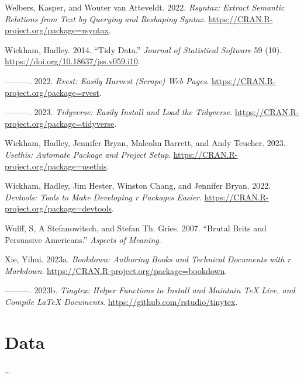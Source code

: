 \documentclass[
  letterpaper,
]{latex/krantz}
\newlength{\cslhangindent}
\newlength{\cslentryspacingunit} %
\newenvironment{CSLReferences}[2] %
 {%
  \setlength{\parindent}{0pt}
  \ifodd #1
  \let\oldpar\par
  \def\par{\hangindent=\cslhangindent\oldpar}
  \fi
  \setlength{\parskip}{#2\cslentryspacingunit}
 }%
 {}
\begin{document}
\begin{CSLReferences}{1}{0}
\leavevmode{}%
Welbers, Kasper, and Wouter van Atteveldt. 2022. \emph{Rsyntax: Extract
Semantic Relations from Text by Querying and Reshaping Syntax}.
\url{https://CRAN.R-project.org/package=rsyntax}.

\leavevmode{}%
Wickham, Hadley. 2014. {``Tidy Data.''} \emph{Journal of Statistical
Software} 59 (10). \url{https://doi.org/10.18637/jss.v059.i10}.

\leavevmode{}%
---------. 2022. \emph{Rvest: Easily Harvest (Scrape) Web Pages}.
\url{https://CRAN.R-project.org/package=rvest}.

\leavevmode{}%
---------. 2023. \emph{Tidyverse: Easily Install and Load the
Tidyverse}. \url{https://CRAN.R-project.org/package=tidyverse}.

\leavevmode{}%
Wickham, Hadley, Jennifer Bryan, Malcolm Barrett, and Andy Teucher.
2023. \emph{Usethis: Automate Package and Project Setup}.
\url{https://CRAN.R-project.org/package=usethis}.

\leavevmode{}%
Wickham, Hadley, Jim Hester, Winston Chang, and Jennifer Bryan. 2022.
\emph{Devtools: Tools to Make Developing r Packages Easier}.
\url{https://CRAN.R-project.org/package=devtools}.

\leavevmode{}%
Wulff, S, A Stefanowitsch, and Stefan Th. Gries. 2007. {``Brutal Brits
and Persuasive Americans.''} \emph{Aspects of Meaning}.

\leavevmode{}%
Xie, Yihui. 2023a. \emph{Bookdown: Authoring Books and Technical
Documents with r Markdown}.
\url{https://CRAN.R-project.org/package=bookdown}.

\leavevmode{}%
---------. 2023b. \emph{Tinytex: Helper Functions to Install and
Maintain TeX Live, and Compile LaTeX Documents}.
\url{https://github.com/rstudio/tinytex}.

\end{CSLReferences}

\cleardoublepage
{}
{}
\appendix

\hypertarget{data-appendix}{%
\chapter{Data}\label{data-appendix}}

\ldots{}



\printindex
\end{document}

